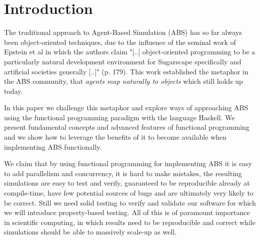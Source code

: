 \section{Introduction}


The traditional approach to Agent-Based Simulation (ABS) has so far always been object-oriented techniques, due to the influence of the seminal work of Epstein et al \cite{epstein_growing_1996} in which the authors claim "[..] object-oriented programming to be a particularly natural development environment for Sugarscape specifically and artificial societies generally [..]" (p. 179). This work established the metaphor in the ABS community, that \textit{agents map naturally to objects} \cite{north_managing_2007} which still holds up today.

In this paper we challenge this metaphor and explore ways of approaching ABS using the functional programming paradigm with the language Haskell. We present fundamental concepts and advanced features of functional programming and we show how to leverage the benefits of it \cite{hudak_history_2007} to become available when implementing ABS functionally.

We claim that by using functional programming for implementing ABS it is easy to add parallelism and concurrency, it is hard to make mistakes, the resulting simulations are easy to test and verify, guaranteed to be reproducible already at compile-time, have few potential sources of bugs and are ultimately very likely to be correct. Still we need solid testing to verify and validate our software for which we will introduce property-based testing. All of this is of paramount importance in scientific computing, in which results need to be reproducible and correct while simulations should be able to massively scale-up as well.


